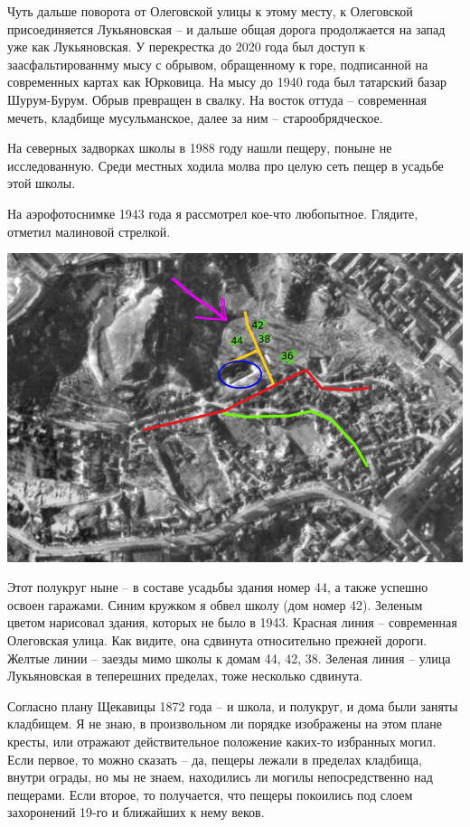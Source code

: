 Чуть дальше поворота от Олеговской улицы к этому месту, к Олеговской присоединяется Лукьяновская – и дальше общая дорога продолжается на запад уже как Лукьяновская. У перекрестка до 2020 года был доступ к заасфальтированнму мысу с обрывом, обращенному к горе, подписанной на современных картах как Юрковица. На мысу до 1940 года был татарский базар Шурум-Бурум. Обрыв превращен в свалку. На восток оттуда – современная мечеть, кладбище мусульманское, далее за ним – старообрядческое.

На северных задворках школы в 1988 году нашли пещеру, поныне не исследованную. Среди местных ходила молва про целую сеть пещер в усадьбе этой школы.

На аэрофотоснимке 1943 года я рассмотрел кое-что любопытное. Глядите, отметил малиновой стрелкой.

\begin{center}
\includegraphics[width=\linewidth]{chast-colebanie-osnov/sheka/she.jpg}
\end{center}

Этот полукруг ныне – в составе усадьбы здания номер 44, а также успешно освоен гаражами. Синим кружком я обвел школу (дом номер 42). Зеленым цветом нарисовал здания, которых не было в 1943. Красная линия – современная Олеговская улица. Как видите, она сдвинута относительно прежней дороги. Желтые линии – заезды мимо школы к домам 44, 42, 38. Зеленая линия – улица Лукьяновская в теперешних пределах, тоже несколько сдвинута.

Согласно плану Щекавицы 1872 года – и школа, и полукруг, и дома были заняты кладбищем. Я не знаю, в произвольном ли порядке изображены на этом плане кресты, или отражают действительное положение каких-то избранных могил. Если первое, то можно сказать – да, пещеры лежали в пределах кладбища, внутри ограды, но мы не знаем, находились ли могилы непосредственно над пещерами. Если второе, то получается, что пещеры покоились под слоем захоронений 19-го и ближайших к нему веков. 

